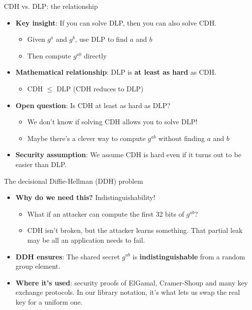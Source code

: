 \ifdefined\PRESENTATION\else\PassOptionsToClass{handout}{beamer}\fi\documentclass[aspectratio=169, lualatex]{beamer}
\begin{document}
\begin{frame}{CDH vs. DLP: the relationship}
	\begin{itemize}[<+->]
		\item \textbf{Key insight}: If you can solve DLP, then you can also solve CDH.
		      \begin{itemize}
			      \item Given $g^a$ and $g^b$, use DLP to find $a$ and $b$
			      \item Then compute $g^{ab}$ directly
		      \end{itemize}
		\item \textbf{Mathematical relationship}: DLP is \textbf{at least as hard} as CDH.
		      \begin{itemize}
			      \item CDH $\leq$ DLP (CDH reduces to DLP)
		      \end{itemize}
		\item \textbf{Open question}: Is CDH at least as hard as DLP?
		      \begin{itemize}
			      \item We don't know if solving CDH allows you to solve DLP!
			      \item Maybe there's a clever way to compute $g^{ab}$ without finding $a$ and $b$
		      \end{itemize}
		\item \textbf{Security assumption}: We assume CDH is hard even if it turns out to be easier than DLP.
	\end{itemize}
\end{frame}

\begin{frame}{The decisional Diffie-Hellman (DDH) problem}
	\begin{itemize}[<+->]
		\item \textbf{Why do we need this?} Indistinguishability!
		      \begin{itemize}
			      \item What if an attacker can compute the first 32 bits of $g^{ab}$?
			      \item CDH isn't broken, but the attacker learns something. That partial leak may be all an application needs to fail.
		      \end{itemize}
		\item \textbf{DDH ensures}: The shared secret $g^{ab}$ is \textbf{indistinguishable} from a random group element.
		\item \textbf{Where it's used}: security proofs of ElGamal, Cramer-Shoup and many key exchange protocols. In our library notation, it's what lets us swap the real key for a uniform one.
	\end{itemize}
\end{frame}
\end{document}
